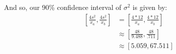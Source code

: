 \documentclass{article}
\begin{document}
And so, our 90\% confidence interval of $\sigma^2$ is given by:
\begin{align*}
    \left[\frac{4s^2}{x_a},\frac{4s^2}{x_b}\right]&=\left[\frac{4*12}{x_a},\frac{4*12}{x_b}\right]\tag{$s^2=12$}\\
    &\approx\left[\frac{48}{9.488},\frac{48}{.711}\right]\tag{$x_a=9.488,x_b=.711$}\\
    &\approx[5.059,67.511]
\end{align*}
\end{document}
